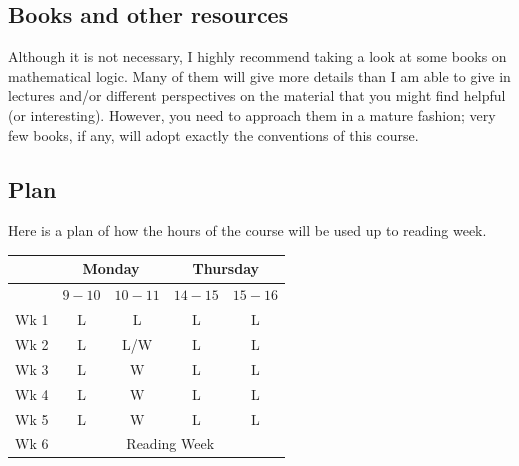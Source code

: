 \documentclass[11pt]{article}
\begin{document}
\subsection*{Books and other resources}

Although it is not necessary, I highly recommend taking a look at some books on mathematical logic. Many of them will give more details than I am able to give in lectures and/or different perspectives on the material that you might find helpful (or interesting). However, you need to approach them in a mature fashion; very few books, if any, will adopt exactly the conventions of this course. %

\subsection*{Plan}
Here is a plan of how the hours of the course will be used up to reading week.
\begin{center}
\begin{tabular}{|c|c|c|c|c|}
\hline
 & \multicolumn{2}{|c|}{Monday} & \multicolumn{2}{|c|}{Thursday} \\
\hline
 & $9-10$ & $10-11$ & $14-15$ & $15-16$ \\
\hline
Wk 1 & L & L & L & L \\
\hline
Wk 2 & L & L/W & L & L \\
\hline
Wk 3 & L & W & L & L \\
\hline
Wk 4 & L & W & L & L \\
\hline
Wk 5 & L & W & L & L \\
\hline
Wk 6 & \multicolumn{4}{|c|}{Reading Week} \\
\hline
\end{tabular}
\end{center}

\end{document}
